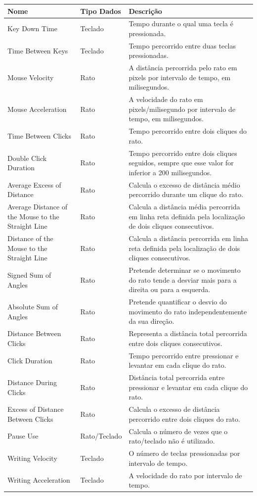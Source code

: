 \begin{center}
    \begin{longtable}{ | p{4cm} | l | p{7cm} |}
    \hline
    Nome & Tipo Dados & Descrição \\ \hline
    Key Down Time & Teclado & Tempo durante o qual uma tecla é pressionada. \\ \hline    		    Time Between Keys & Teclado & Tempo percorrido entre duas teclas pressionadas. \\ \hline
    Mouse Velocity & Rato & A distância percorrida pelo rato em pixels por intervalo de tempo, em milisegundos. \\ \hline
    Mouse Acceleration & Rato & A velocidade do rato em pixels/milisegundo por intervalo de tempo, em milisegundos. \\ \hline
    Time Between Clicks & Rato & Tempo percorrido entre dois cliques do rato. \\ \hline
    Double Click Duration & Rato & Tempo percorrido entre dois cliques seguidos, sempre que esse valor for inferior a 200 milisegundos. \\ \hline
    Average Excess of Distance & Rato & Calcula o excesso de distância médio percorrido durante um clique do rato. \\ \hline
    Average Distance of the Mouse to the Straight Line & Rato & Calcula a distância média percorrida em linha reta definida pela localização de dois cliques consecutivos. \\ \hline
    Distance of the Mouse to the Straight Line & Rato & Calcula a distância percorrida em linha reta definida pela localização de dois cliques consecutivos. \\ \hline
    Signed Sum of Angles & Rato & Pretende determinar se o movimento do rato tende a desviar mais para a direita ou para a esquerda. \\ \hline
    Absolute Sum of Angles & Rato & Pretende quantificar o desvio do movimento do rato independentemente da sua direção. \\ \hline
    Distance Between Clicks & Rato & Representa a distância total percorrida entre dois cliques consecutivos. \\ \hline
    Click Duration & Rato  & Tempo percorrido entre pressionar e levantar em cada clique do rato. \\ \hline
   Distance During Clicks &  Rato &  Distância total percorrida entre pressionar e levantar em cada clique do rato.\\ \hline
   Excess of Distance Between Clicks & Rato  & Calcula o excesso de distância percorrido entre dois cliques do rato. \\ \hline
   Pause Use & Rato/Teclado  & Calcula o número de vezes que o rato/teclado não é utilizado. \\ \hline
   Writing Velocity & Teclado  & O número de teclas pressionadas por intervalo de tempo. \\ \hline
   Writing Acceleration & Teclado  & A velocidade do rato por intervalo de tempo. \\ \hline
    \end{longtable}
\end{center}



